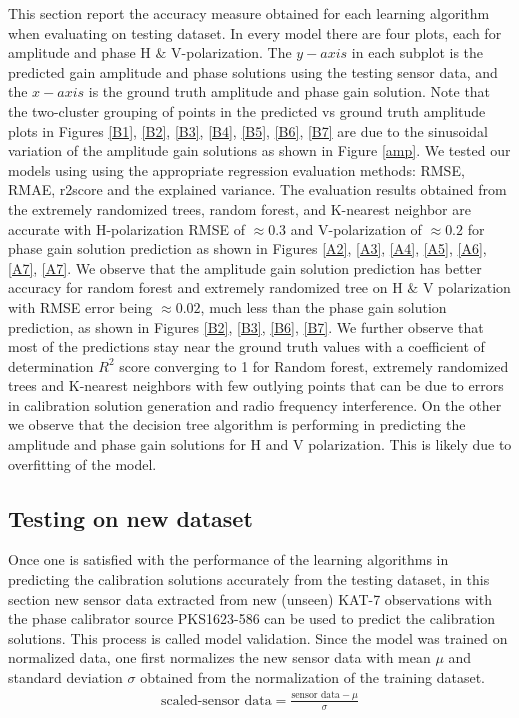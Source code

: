 This section report the accuracy measure obtained for each learning algorithm when evaluating on testing dataset. In every model there are four plots, each for amplitude and phase H $\&$ V-polarization. The $y-axis$ in each subplot is the predicted gain amplitude and phase solutions using the testing sensor data, and the $x-axis$ is the ground truth amplitude and phase gain solution. Note that the two-cluster grouping of points in the predicted vs ground truth amplitude plots in Figures \ref{B1}, \ref{B2}, \ref{B3}, \ref{B4}, \ref{B5}, \ref{B6}, \ref{B7} are due to the sinusoidal variation of the amplitude gain solutions as shown in Figure \ref{amp}. We tested our models using using the appropriate regression evaluation methods: RMSE, RMAE, r2score and the explained variance. The evaluation results obtained from the extremely randomized trees, random forest, and K-nearest neighbor are accurate with H-polarization RMSE of $\approx 0.3$  and V-polarization of $\approx 0.2$ for phase gain solution prediction as shown in Figures \ref{A2}, \ref{A3}, \ref{A4}, \ref{A5}, \ref{A6}, \ref{A7}, \ref{A7}. We observe that the amplitude gain solution prediction has better accuracy for random forest and extremely randomized tree on H $\&$ V polarization with RMSE error being $\approx 0.02$, much less than the phase gain solution prediction, as shown in Figures \ref{B2}, \ref{B3}, \ref{B6}, \ref{B7}. We further observe that most of the predictions stay near the ground truth values with a coefficient of determination $R^2$ score converging to 1 for Random forest, extremely randomized trees and K-nearest neighbors with few outlying points that can be due to errors in calibration solution generation and radio frequency interference. On the other we observe that the decision tree algorithm is performing in predicting the amplitude and phase gain solutions for H and V polarization. This is likely due to overfitting of the model. 


\subsection{Testing on new dataset}

Once one is satisfied with the performance of the learning algorithms in predicting the calibration solutions accurately from the testing dataset, in this section new sensor data extracted from new (unseen) KAT-7 observations with the phase calibrator source PKS1623-586 can be used to predict the calibration solutions. This process is called model validation. Since the model was trained on normalized data, one first normalizes the new sensor data with mean $\mu$ and standard deviation $\sigma$ obtained from the normalization of the training dataset.
\begin{align}
\text{scaled-sensor data}= \frac{\text{sensor data}- \mu}{\sigma}
\end{align}

